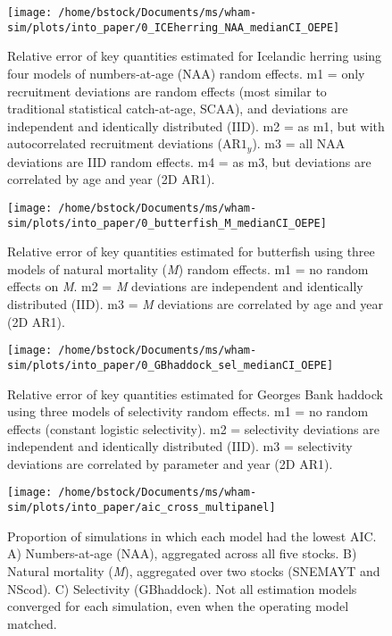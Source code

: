 \documentclass[]{article}
\begin{document}
\pagebreak

\begin{figure}

{\centering \texttt{[image: /home/bstock/Documents/ms/wham-sim/plots/into\_paper/0\_ICEherring\_NAA\_medianCI\_OEPE]} 

}

\caption{Relative error of key quantities estimated for Icelandic herring using four models of numbers-at-age (NAA) random effects. m1 = only recruitment deviations are random effects (most similar to traditional statistical catch-at-age, SCAA), and deviations are independent and identically distributed (IID). m2 = as m1, but with autocorrelated recruitment deviations ($\text{AR1}_y$). m3 = all NAA deviations are IID random effects. m4 = as m3, but deviations are correlated by age and year (2D AR1).}\label{fig:rel-error-ICEherring-naa}
\end{figure}

\pagebreak

\begin{figure}

{\centering \texttt{[image: /home/bstock/Documents/ms/wham-sim/plots/into\_paper/0\_butterfish\_M\_medianCI\_OEPE]} 

}

\caption{Relative error of key quantities estimated for butterfish using three models of natural mortality (\textit{M}) random effects. m1 = no random effects on \textit{M}. m2 = \textit{M} deviations are independent and identically distributed (IID). m3 = \textit{M} deviations are correlated by age and year (2D AR1).}\label{fig:rel-error-butterfish-m}
\end{figure}

\pagebreak

\begin{figure}

{\centering \texttt{[image: /home/bstock/Documents/ms/wham-sim/plots/into\_paper/0\_GBhaddock\_sel\_medianCI\_OEPE]} 

}

\caption{Relative error of key quantities estimated for Georges Bank haddock using three models of selectivity random effects. m1 = no random effects (constant logistic selectivity). m2 = selectivity deviations are independent and identically distributed (IID). m3 = selectivity deviations are correlated by parameter and year (2D AR1).}\label{fig:rel-error-GBhaddock-sel}
\end{figure}

\pagebreak

\begin{figure}

{\centering \texttt{[image: /home/bstock/Documents/ms/wham-sim/plots/into\_paper/aic\_cross\_multipanel]} 

}

\caption{Proportion of simulations in which each model had the lowest AIC. A) Numbers-at-age (NAA), aggregated across all five stocks. B) Natural mortality (\textit{M}), aggregated over two stocks (SNEMAYT and NScod). C) Selectivity (GBhaddock). Not all estimation models converged for each simulation, even when the operating model matched.}\label{fig:aic-cross}
\end{figure}
\end{document}
